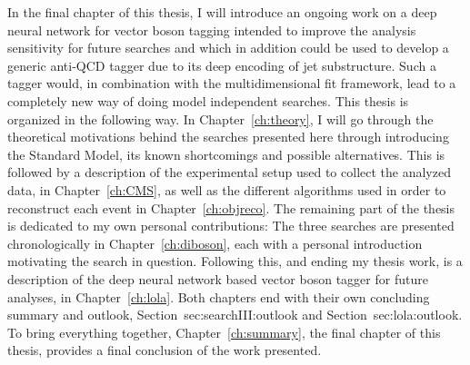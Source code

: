 In the final chapter of this thesis, I will introduce an ongoing work on a deep neural network for vector boson tagging intended to improve the analysis sensitivity for future searches and which in addition could be used to develop a generic anti-QCD tagger due to its deep encoding of jet substructure. Such a tagger would, in combination with the multidimensional fit framework, lead to a completely new way of doing model independent searches.
\newline
\newline
This thesis is organized in the following way. In Chapter~\ref{ch:theory}, I will go through the theoretical motivations behind the searches presented here through introducing the Standard Model, its known shortcomings and possible alternatives. This is followed by a description of the experimental setup used to collect the analyzed data, in Chapter~\ref{ch:CMS}, as well as the different algorithms used in order to reconstruct each event in Chapter~\ref{ch:objreco}. The remaining part of the thesis is dedicated to my own personal contributions: The three searches are presented chronologically in Chapter~\ref{ch:diboson}, each with a personal introduction motivating the search in question. Following this, and ending my thesis work, is a description of the deep neural network based vector boson tagger for future analyses, in Chapter~\ref{ch:lola}. Both chapters end with their own concluding summary and outlook, Section~{sec:searchIII:outlook} and Section~{sec:lola:outlook}.  To bring everything together, Chapter~\ref{ch:summary}, the final chapter of this thesis, provides a final conclusion of the work presented.